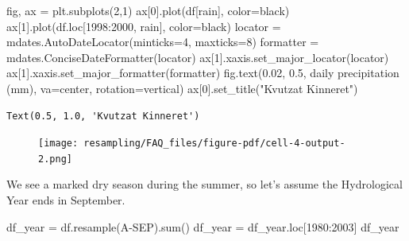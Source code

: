 \documentclass[
  letterpaper,
  DIV=11,
  numbers=noendperiod,
  oneside]{scrreprt}
\newenvironment{Shaded}{\begin{snugshade}}{\end{snugshade}}
\newcommand{\BuiltInTok}[1]{\textcolor[rgb]{0.00,0.23,0.31}{#1}}
\newcommand{\DecValTok}[1]{\textcolor[rgb]{0.68,0.00,0.00}{#1}}
\newcommand{\FloatTok}[1]{\textcolor[rgb]{0.68,0.00,0.00}{#1}}
\newcommand{\NormalTok}[1]{\textcolor[rgb]{0.00,0.23,0.31}{#1}}
\newcommand{\OperatorTok}[1]{\textcolor[rgb]{0.37,0.37,0.37}{#1}}
\newcommand{\StringTok}[1]{\textcolor[rgb]{0.13,0.47,0.30}{#1}}
\begin{document}
\begin{Shaded}
\begin{Highlighting}[]
\NormalTok{fig, ax }\OperatorTok{=}\NormalTok{ plt.subplots(}\DecValTok{2}\NormalTok{,}\DecValTok{1}\NormalTok{)}
\NormalTok{ax[}\DecValTok{0}\NormalTok{].plot(df[}\StringTok{\textquotesingle{}rain\textquotesingle{}}\NormalTok{], color}\OperatorTok{=}\StringTok{\textquotesingle{}black\textquotesingle{}}\NormalTok{)}
\NormalTok{ax[}\DecValTok{1}\NormalTok{].plot(df.loc[}\StringTok{\textquotesingle{}1998\textquotesingle{}}\NormalTok{:}\StringTok{\textquotesingle{}2000\textquotesingle{}}\NormalTok{, }\StringTok{\textquotesingle{}rain\textquotesingle{}}\NormalTok{], color}\OperatorTok{=}\StringTok{\textquotesingle{}black\textquotesingle{}}\NormalTok{)}
\NormalTok{locator }\OperatorTok{=}\NormalTok{ mdates.AutoDateLocator(minticks}\OperatorTok{=}\DecValTok{4}\NormalTok{, maxticks}\OperatorTok{=}\DecValTok{8}\NormalTok{)}
\NormalTok{formatter }\OperatorTok{=}\NormalTok{ mdates.ConciseDateFormatter(locator)}
\NormalTok{ax[}\DecValTok{1}\NormalTok{].xaxis.set\_major\_locator(locator)}
\NormalTok{ax[}\DecValTok{1}\NormalTok{].xaxis.set\_major\_formatter(formatter)}
\NormalTok{fig.text(}\FloatTok{0.02}\NormalTok{, }\FloatTok{0.5}\NormalTok{, }\StringTok{\textquotesingle{}daily precipitation (mm)\textquotesingle{}}\NormalTok{, va}\OperatorTok{=}\StringTok{\textquotesingle{}center\textquotesingle{}}\NormalTok{, rotation}\OperatorTok{=}\StringTok{\textquotesingle{}vertical\textquotesingle{}}\NormalTok{)}
\NormalTok{ax[}\DecValTok{0}\NormalTok{].set\_title(}\StringTok{"Kvutzat Kinneret"}\NormalTok{)}
\end{Highlighting}
\end{Shaded}

\begin{verbatim}
Text(0.5, 1.0, 'Kvutzat Kinneret')
\end{verbatim}

\begin{figure}[H]

{\centering \texttt{[image: resampling/FAQ\_files/figure-pdf/cell-4-output-2.png]}

}

\end{figure}

We see a marked dry season during the summer, so let's assume the
Hydrological Year ends in September.

\begin{Shaded}
\begin{Highlighting}[]
\NormalTok{df\_year }\OperatorTok{=}\NormalTok{ df.resample(}\StringTok{\textquotesingle{}A{-}SEP\textquotesingle{}}\NormalTok{).}\BuiltInTok{sum}\NormalTok{()}
\NormalTok{df\_year }\OperatorTok{=}\NormalTok{ df\_year.loc[}\StringTok{\textquotesingle{}1980\textquotesingle{}}\NormalTok{:}\StringTok{\textquotesingle{}2003\textquotesingle{}}\NormalTok{]}
\NormalTok{df\_year}
\end{Highlighting}
\end{Shaded}
\end{document}
